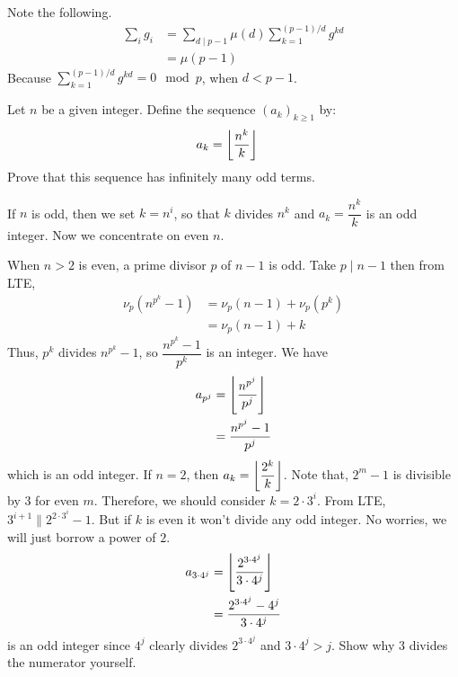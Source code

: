\begin{solution}
	Note the following.
		\begin{align*}
			\sum_ig_i
				& =\sum_{d\mid p-1}\mu(d)\sum_{k=1}^{(p-1)/d}g^{kd}\\
				& =\mu(p-1)
		\end{align*}
	Because $\sum_{k=1}^{(p-1)/d}g^{kd}=0\mod p$, when $d<p-1$.
\end{solution}

\begin{problem}
	Let $n$ be a given integer. Define the sequence $(a_k)_{k\geq1}$ by:
		\begin{align*}
			a_k & = \left\lfloor{\dfrac{n^k}{k}}\right\rfloor
		\end{align*}
	Prove that this sequence has infinitely many odd terms.
\end{problem}

\begin{solution}
	If $n$ is odd, then we set $k=n^i$, so that $k$ divides $n^k$ and $a_k=\dfrac{n^k}{k}$ is an odd integer. Now we concentrate on even $n$.

	When $n>2$ is even, a prime divisor $p$ of $n-1$ is odd. Take $p\mid n-1$ then from LTE,
		\begin{align*}
			\nu_p\left(n^{p^k}-1\right) & = \nu_p(n-1)+\nu_p(p^k)\\
										& = \nu_p(n-1)+k
		\end{align*}
	Thus, $p^k$ divides $n^{p^k}-1$, so $\dfrac{n^{p^k}-1}{p^k}$ is an integer. We have
		\begin{align*}
			a_{p^j} & = \left\lfloor{\dfrac{n^{p^j}}{p^j}}\right\rfloor\\
					& = \dfrac{n^{p^j}-1}{p^j}
		\end{align*}
	which is an odd integer. If $n=2$, then $a_k=\left\lfloor{\dfrac{2^k}{k}}\right\rfloor$. Note that, $2^m-1$ is divisible by $3$ for even $m$. Therefore, we should consider $k=2\cdot3^i$. From LTE, $3^{i+1}\|2^{2\cdot3^i}-1$. But if $k$ is even it won't divide any odd integer. No worries, we will just borrow a power of $2$.
		\begin{align*}
			a_{3\cdot4^j} & = \left\lfloor{\dfrac{2^{3\cdot4^j}}{3\cdot4^j}}\right\rfloor\\
				  & = \dfrac{2^{3\cdot4^j}-4^j}{3\cdot4^j}
		\end{align*}
	is an odd integer since $4^j$ clearly divides $2^{3\cdot4^j}$ and $3\cdot4^j>j$. Show why $3$ divides the numerator yourself.
\end{solution}

